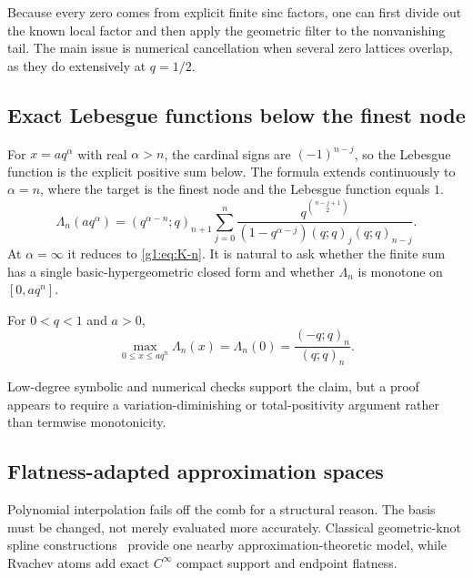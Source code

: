 Because every zero comes from explicit finite sinc factors, one can first
divide out the known local factor and then apply the geometric filter to the
nonvanishing tail.  The main issue is numerical cancellation when several
zero lattices overlap, as they do extensively at $q=1/2$.

\subsection{Exact Lebesgue functions below the finest node}

For $x=aq^\alpha$ with real $\alpha>n$, the cardinal signs are
$(-1)^{n-j}$, so the Lebesgue function is the explicit positive sum below.
The formula extends continuously to $\alpha=n$, where the target is the finest
node and the Lebesgue function equals $1$.
\begin{equation}
 \Lambda_n(aq^\alpha)=
 (q^{\alpha-n};q)_{n+1}
 \sum_{j=0}^n
 \frac{q^{\binom{n-j+1}{2}}}
 {(1-q^{\alpha-j})(q;q)_j(q;q)_{n-j}}.
 \label{g2:eq:below-comb-lebesgue}
\end{equation}
At $\alpha=\infty$ it reduces to \eqref{g1:eq:K-n}.  It is natural to ask
whether the finite sum has a single basic-hypergeometric closed form and
whether $\Lambda_n$ is monotone on $[0,aq^n]$.

\begin{conjecture}
\label{g2:conj:below-comb-lebesgue}
For $0<q<1$ and $a>0$,
\begin{equation}
 \max_{0\le x\le aq^n}\Lambda_n(x)=\Lambda_n(0)
 =\frac{(-q;q)_n}{(q;q)_n}.
 \label{g2:eq:below-comb-max}
\end{equation}
\end{conjecture}

Low-degree symbolic and numerical checks support the claim, but a proof
appears to require a variation-diminishing or total-positivity argument rather
than termwise monotonicity.

\subsection{Flatness-adapted approximation spaces}

Polynomial interpolation fails off the comb for a structural reason.  The
basis must be changed, not merely evaluated more accurately.  Classical
geometric-knot spline constructions~\cite{KocakPhillips1994} provide one
nearby approximation-theoretic model, while Rvachev atoms add exact
$C^\infty$ compact support and endpoint flatness.


